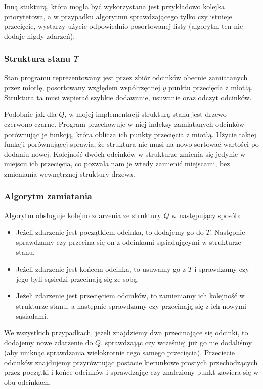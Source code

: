 \documentclass[11pt,a4paper]{article}
\begin{document}
Inną stukturą, która mogła być wykorzystana jest przykładowo
kolejka priorytetowa, a w przypadku algorytmu sprawdzającego
tylko czy istnieje przecięcie, wystarzy użycie odpowiednio
posortowanej listy (algorytm ten nie dodaje nigdy zdarzeń).

\subsubsection{Struktura stanu $T$}
Stan programu reprezentowany jest przez zbiór odcinków
obecnie zamiatanych przez miotłę, posortowany względem
współrzędnej $y$ punktu przecięcia z miotłą.
Struktura ta musi wspierać szybkie dodawanie, usuwanie
oraz odczyt odcinków.

Podobnie jak dla $Q$, w mojej implementacji strukturą stanu
jest drzewo czerwono-czarne. Program przechowuje w niej 
indeksy zamiatanych odcinków porównując je funkcją, która
oblicza ich punkty przecięcia z miotłą. Użycie takiej funkcji
porównującej sprawia, że struktura nie musi na nowo sortować
wartości po dodaniu nowej. Kolejność dwóch odcinków w strukturze 
zmienia się jedynie w miejscu ich przecięcia, co pozwala nam
je wtedy zamienić miejscami, bez zmieniania wewnętrznej struktury
drzewa.

\subsubsection{Algorytm zamiatania}
Algorytm obsługuje kolejno zdarzenia ze struktury $Q$
w następujący sposób:
\begin{itemize}
    \item Jeżeli zdarzenie jest początkiem odcinka, 
    to dodajemy go do $T$. Następnie sprawdzamy
    czy przecina się on z odcinkami sąsiadującymi
    w strukturze stanu.
    \item Jeżeli zdarzenie jest końcem odcinka,
    to usuwamy go z $T$ i sprawdzamy czy jego byli
    sąsiedzi przecinają się ze sobą.
    \item Jeżeli zdarzenie jest przecięciem odcinków,
    to zamieniamy ich kolejność w strukturze stanu,
    a następnie sprawdzamy czy przecinają się z ich 
    nowymi sąsiadami.
\end{itemize}
We wszystkich przypadkach, jeżeli znajdziemy dwa 
przecinające się odcinki, to dodajemy nowe zdarzenie
do $Q$, sprawdzając czy wcześniej już go nie dodaliśmy
(aby uniknąc sprawdzania wielokrotnie tego samego przecięcia).
Przeciecie odcinków znajdujemy przyrównując postacie kierunkowe
prostych przechodzących przez początki i końce odcinków i sprawdzając
czy znaleziony punkt zawiera się w obu odcinkach.
\end{document}
